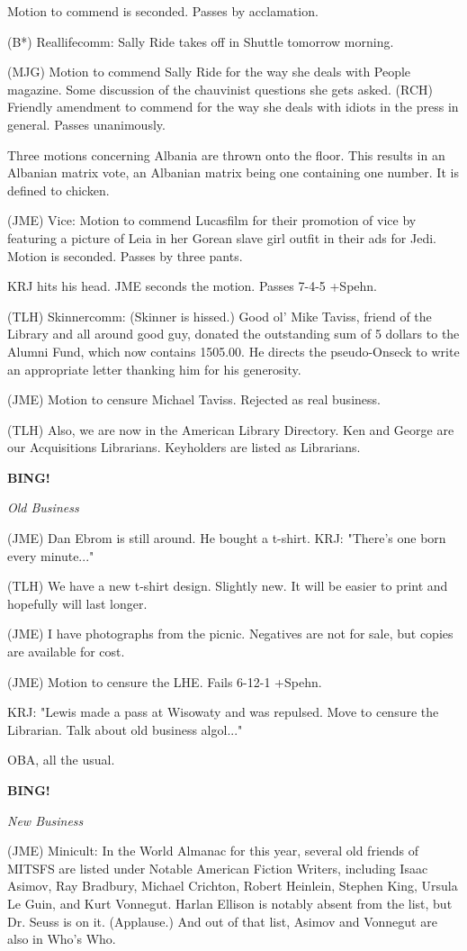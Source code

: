 \documentclass[12pt]{article}
\newcommand{\bing}{{\bf BING!} }
\newcommand{\goto}[1]{\bing \vskip 12pt \centerline{{\em{#1}}}}
\begin{document}
Motion to commend is seconded. Passes by acclamation.

(B*) Reallifecomm: Sally Ride takes off in Shuttle tomorrow morning.

(MJG) Motion to commend Sally Ride for the way she deals with People magazine. Some discussion of the chauvinist questions she gets asked. (RCH) Friendly amendment to commend for the way she deals with idiots in the press in general. Passes unanimously.

Three motions concerning Albania are thrown onto the floor. This results in an Albanian matrix vote, an Albanian matrix being one containing one number. It is defined to chicken.

(JME) Vice: Motion to commend Lucasfilm for their promotion of vice by featuring a picture of Leia in her Gorean slave girl outfit in their ads for Jedi. Motion is seconded. Passes by three pants.

KRJ hits his head. JME seconds the motion. Passes 7-4-5 +Spehn.

(TLH) Skinnercomm: (Skinner is hissed.) Good ol' Mike Taviss, friend of the Library and all around good guy, donated the outstanding sum of 5 dollars to the Alumni Fund, which now contains 1505.00. He directs the pseudo-Onseck to write an appropriate letter thanking him for his generosity.

(JME) Motion to censure Michael Taviss. Rejected as real business.

(TLH) Also, we are now in the American Library Directory. Ken and George are our Acquisitions Librarians. Keyholders are listed as Librarians.

\goto{Old Business}

(JME) Dan Ebrom is still around. He bought a t-shirt. KRJ: "There's one born every minute..."

(TLH) We have a new t-shirt design. Slightly new. It will be easier to print and hopefully will last longer.

(JME) I have photographs from the picnic. Negatives are not for sale, but copies are available for cost.

(JME) Motion to censure the LHE. Fails 6-12-1 +Spehn.

KRJ: "Lewis made a pass at Wisowaty and was repulsed. Move to censure the Librarian. Talk about old business algol..."

OBA, all the usual.

\goto{New Business}

(JME) Minicult: In the World Almanac for this year, several old friends of MITSFS are listed under Notable American Fiction Writers, including Isaac Asimov, Ray Bradbury, Michael Crichton, Robert Heinlein, Stephen King, Ursula Le Guin, and Kurt Vonnegut. Harlan Ellison is notably absent from the list, but Dr. Seuss is on it. (Applause.) And out of that list, Asimov and Vonnegut are also in Who's Who.
\end{document}
